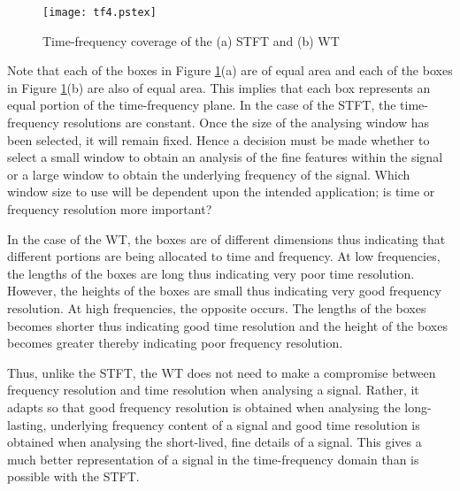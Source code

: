 \documentclass[12pt]{report}
\begin{document}
\begin{figure}[htb]
	\begin{center}
		\texttt{[image: tf4.pstex]}
		\caption{Time-frequency coverage of the (a) STFT and (b) WT}
		\label{timeFreq}
	\end{center}
\end{figure}


Note that each of the boxes in Figure \ref{timeFreq}(a) are of equal area and each of the boxes in Figure \ref{timeFreq}(b) are
also of equal area. This implies that each box represents an equal portion of the time-frequency 
plane. 
In the case of the STFT, the time-frequency resolutions are constant. Once the
size of the analysing window has been selected, it will remain fixed. Hence
a decision must be made whether to select a small window to obtain an analysis
of the fine features within the signal or a large window to obtain the
underlying frequency of the signal. Which window size to use will be
dependent upon the intended application; is time or frequency resolution more important?

In the case of the WT, the boxes are of different dimensions
thus indicating that different portions are being allocated to time and frequency.
At low frequencies, the lengths of the boxes are long thus indicating very poor 
time resolution. However, the heights of the boxes are small thus indicating 
very good frequency resolution. 
At high frequencies, the opposite occurs.
The lengths of the boxes becomes shorter thus indicating good time resolution
and the height of the boxes becomes greater thereby indicating poor
frequency resolution.

Thus, unlike the STFT, the WT does not need to make a compromise
between frequency resolution and time resolution when analysing a signal. Rather,
it adapts so that good frequency resolution is obtained when analysing the long-lasting, underlying frequency
content of a signal and good time resolution is obtained when analysing the short-lived, fine
details of a signal. 
This gives a much better representation of a signal in the
time-frequency domain than is possible with the STFT.
\end{document}
